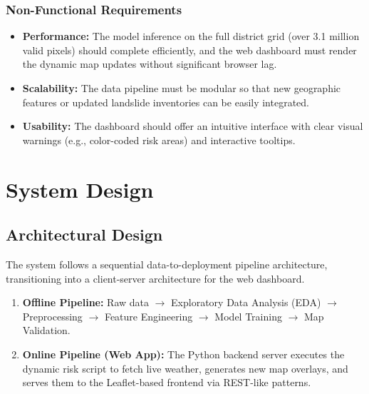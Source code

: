 \subsubsection{Non-Functional Requirements}
\begin{itemize}
    \item \textbf{Performance:} The model inference on the full district grid (over 3.1 million valid pixels) should complete efficiently, and the web dashboard must render the dynamic map updates without significant browser lag.
    \item \textbf{Scalability:} The data pipeline must be modular so that new geographic features or updated landslide inventories can be easily integrated.
    \item \textbf{Usability:} The dashboard should offer an intuitive interface with clear visual warnings (e.g., color-coded risk areas) and interactive tooltips.
\end{itemize}

\section{System Design}

\subsection{Architectural Design}
The system follows a sequential data-to-deployment pipeline architecture, transitioning into a client-server architecture for the web dashboard.
\begin{enumerate}
    \item \textbf{Offline Pipeline:} Raw data $\rightarrow$ Exploratory Data Analysis (EDA) $\rightarrow$ Preprocessing $\rightarrow$ Feature Engineering $\rightarrow$ Model Training $\rightarrow$ Map Validation.
    \item \textbf{Online Pipeline (Web App):} The Python backend server executes the dynamic risk script to fetch live weather, generates new map overlays, and serves them to the Leaflet-based frontend via REST-like patterns.
\end{enumerate}

